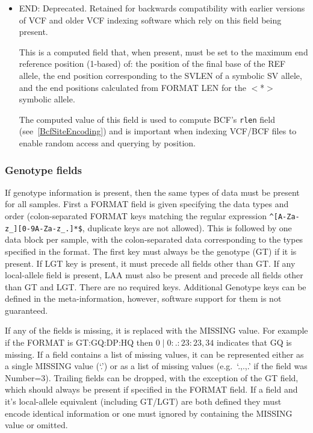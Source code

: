 \documentclass[8pt]{article}
\begin{document}
\begin{itemize}
\renewcommand{\labelitemii}{$\circ$}
\item END: Deprecated.
Retained for backwards compatibility with  earlier versions of VCF and older VCF indexing software which rely on this field being present.

This is a computed field that, when present, must be set to the maximum end reference position (1-based) of:
the position of the final base of the REF allele,
the end position corresponding to the SVLEN of a symbolic SV allele,
and the end positions calculated from FORMAT LEN for the $<$*$>$ symbolic allele.

The computed value of this field is used to compute BCF's {\tt rlen} field (see~\ref{BcfSiteEncoding}) and is important when indexing VCF/BCF files to enable random access and querying by position.

\end{itemize}

\subsubsection{Genotype fields}
If genotype information is present, then the same types of data must be present for all samples.
First a FORMAT field is given specifying the data types and order (colon-separated FORMAT keys matching the regular expression \texttt{\^{}[A-Za-z\_][0-9A-Za-z\_.]*\$}, duplicate keys are not allowed).
This is followed by one data block per sample, with the colon-separated data corresponding to the types specified in the format.
The first key must always be the genotype (GT) if it is present.
If LGT key is present, it must precede all fields other than GT.
If any local-allele field is present, LAA must also be present and precede all fields other than GT and LGT.
There are no required keys.
Additional Genotype keys can be defined in the meta-information, however, software support for them is not guaranteed.

If any of the fields is missing, it is replaced with the MISSING value.
For example if the FORMAT is GT:GQ:DP:HQ then $0\mid0:.:23:23,34$ indicates that GQ is missing.
If a field contains a list of missing values, it can be represented either as a single MISSING value (`.') or as a list of missing values (e.g.\ `.,.,.' if the field was Number=3).
Trailing fields can be dropped, with the exception of the GT field, which should always be present if specified in the FORMAT field.
If a field and it's local-allele equivalent (including GT/LGT) are both defined they must encode identical information or one must ignored by containing the MISSING value or omitted.
\end{document}
